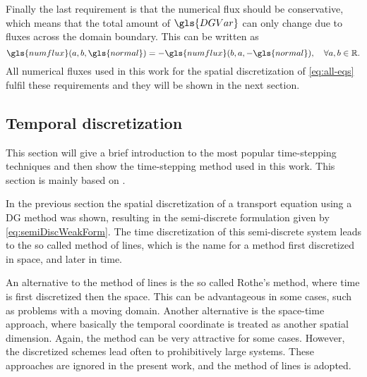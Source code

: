 Finally the last requirement is that the numerical flux should be conservative, which means that the total amount of $\gls{DGVar}$ can only change due to fluxes across the domain boundary. This can be written as
\begin{equation}
	\gls{numflux}(a,b,\gls{normal}) = 	-\gls{numflux}(b,a,-\gls{normal}), \quad \forall a,b \in \mathbb{R}. 
	\label{eq:conservativity}
\end{equation}
All numerical fluxes used in this work for the spatial discretization of \cref{eq:all-eqs} fulfil these requirements and they will be shown in the next section.
\subsection{Temporal discretization}\label{ssec:TemporalDiscretization}
This section will give a brief introduction to the most popular time-stepping techniques and then show the time-stepping method used in this work. This section is mainly based on \textcite{levequeFiniteVolumeMethods2002,ferzigerComputationalMethodsFluid2002}.

In the previous section the spatial discretization of a transport equation using a DG method was shown, resulting in the semi-discrete formulation given by \cref{eq:semiDiscWeakForm}.
The time discretization of this semi-discrete system leads to the so called method of lines, which is the name for a method first discretized in space, and later in time.  

An alternative to the method of lines is the so called Rothe's method, where time is first discretized then the space. This can be advantageous in some cases, such as problems with a moving domain. Another alternative is the space-time approach, where basically the temporal coordinate is treated as another spatial dimension. Again, the method can be very attractive for some cases. However, the discretized schemes lead often to prohibitively large systems. These approaches are ignored in the present work, and the method of lines is adopted.

